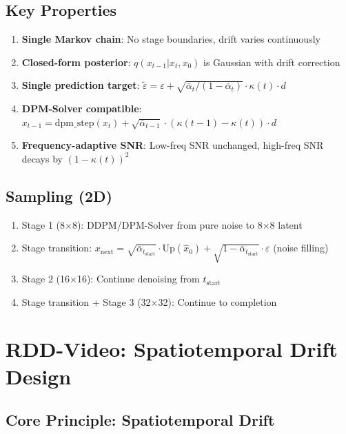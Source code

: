 \documentclass[11pt,a4paper]{article}
\begin{document}
\subsection{Key Properties}
\begin{enumerate}[nosep]
\item \textbf{Single Markov chain}: No stage boundaries, drift varies continuously
\item \textbf{Closed-form posterior}: $q(x_{t-1}|x_t, x_0)$ is Gaussian with drift correction
\item \textbf{Single prediction target}: $\tilde\varepsilon = \varepsilon + \sqrt{\bar\alpha_t/(1-\bar\alpha_t)} \cdot \kappa(t) \cdot d$
\item \textbf{DPM-Solver compatible}: $x_{t-1} = \text{dpm\_step}(x_t) + \sqrt{\bar\alpha_{t-1}} \cdot (\kappa(t-1) - \kappa(t)) \cdot d$
\item \textbf{Frequency-adaptive SNR}: Low-freq SNR unchanged, high-freq SNR decays by $(1-\kappa(t))^2$
\end{enumerate}

\subsection{Sampling (2D)}
\begin{enumerate}[nosep]
\item Stage 1 (8$\times$8): DDPM/DPM-Solver from pure noise to 8$\times$8 latent
\item Stage transition: $x_\text{next} = \sqrt{\bar\alpha_{t_\text{start}}} \cdot \text{Up}(\hat{x}_0) + \sqrt{1-\bar\alpha_{t_\text{start}}} \cdot \varepsilon$ (noise filling)
\item Stage 2 (16$\times$16): Continue denoising from $t_\text{start}$
\item Stage transition + Stage 3 (32$\times$32): Continue to completion
\end{enumerate}

\section{RDD-Video: Spatiotemporal Drift Design}

\subsection{Core Principle: Spatiotemporal Drift}
\end{document}
